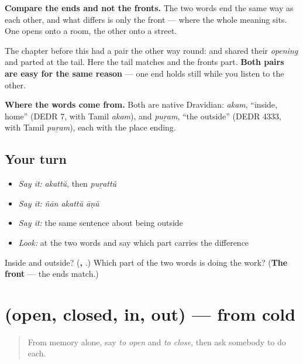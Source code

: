 \begin{cousinweb}
\textbf{Compare the ends and not the fronts.} The two words end the same way as each other, and what differs is only the front — where the whole meaning sits. One opens onto a room, the other onto a street.

The chapter before this had a pair the other way round: \textbf{} and \textbf{} shared their \emph{opening} and parted at the tail. Here the tail matches and the fronts part. \textbf{Both pairs are easy for the same reason} — one end holds still while you listen to the other.

\textbf{Where the words come from.} Both are native Dravidian: \emph{akam}, \textquotedblleft{}inside, home\textquotedblright{} (DEDR 7, with Tamil \emph{akam}), and \emph{puṟam}, \textquotedblleft{}the outside\textquotedblright{} (DEDR 4333, with Tamil \emph{puṟam}), each with the place ending.
\end{cousinweb}

\subsection*{Your turn}
\begin{itemize}
\raggedright
  \item \emph{Say it:} \emph{akattŭ}, then \emph{puṟattŭ}
  \item \emph{Say it:} \emph{ñān akattŭ āṇŭ}
  \item \emph{Say it:} the same sentence about being outside
  \item \emph{Look:} at the two words and say which part carries the difference
\end{itemize}

\begin{tcolorbox}[breakable,colback=teal!4,colframe=teal!35!black,title={Before you move on}]
Inside and outside? (\textbf{, }.) Which part of the two words is doing the work? (\textbf{The front} — the ends match.)
\end{tcolorbox}
\section[(open, closed, in, out)]{(open, closed, in, out) — from cold}

\label{lesson:ML-R95-open-closed-recall}



\begin{quote}
From memory alone, say \emph{to open} and \emph{to close}, then ask somebody to do each.
\end{quote}

